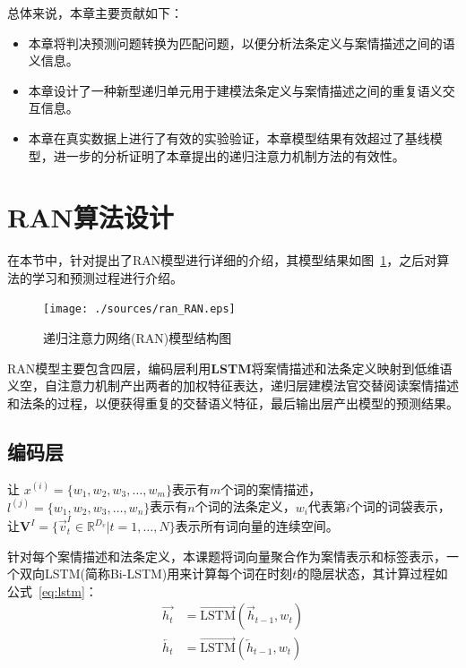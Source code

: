 总体来说，本章主要贡献如下：
\begin{itemize}
    \item 本章将判决预测问题转换为匹配问题，以便分析法条定义与案情描述之间的语义信息。
    \item 本章设计了一种新型递归单元用于建模法条定义与案情描述之间的重复语义交互信息。
    \item 本章在真实数据上进行了有效的实验验证，本章模型结果有效超过了基线模型，进一步的分析证明了本章提出的递归注意力机制方法的有效性。
\end{itemize}

\section{RAN算法设计}
\label{sec:ran_algori}

在本节中，针对提出了RAN模型进行详细的介绍，其模型结果如图~\ref{fig:ran_model}，之后对算法的学习和预测过程进行介绍。
\begin{figure}[htbp]
    \centering
    \texttt{[image: ./sources/ran\_RAN.eps]}
    \vspace{-10pt}
    \caption{\label{fig:ran_model} 递归注意力网络(RAN)模型结构图 }
    \vspace{-5pt}
\end{figure}

RAN模型主要包含四层，编码层利用\textbf{LSTM}将案情描述和法条定义映射到低维语义空，自注意力机制产出两者的加权特征表达，递归层建模法官交替阅读案情描述和法条的过程，以便获得重复的交替语义特征，最后输出层产出模型的预测结果。

\subsection{编码层}
让 $x^{(i)} = {\{w_1, w_2, w_3, \dots, w_m\}}$表示有$m$个词的案情描述， $l^{(j)} = {\{w_1, w_2, w_3, \dots, w_n\}}$表示有$n$个词的法条定义，$w_i$代表第$i$个词的词袋表示，让$\textbf{V}^I=\{\vec{v}^I_t\in \mathbb{R}^{D_v}|t=1,\dots,N\}$表示所有词向量的连续空间。

针对每个案情描述和法条定义，本课题将词向量聚合作为案情表示和标签表示，一个双向LSTM(简称Bi-LSTM)用来计算每个词在时刻$t$的隐层状态，其计算过程如公式~\ref{eq:lstm}：
\begin{equation}\label{eq:lstm}
    \begin{aligned}
        \overrightarrow{h_t}&=\overrightarrow{\text{LSTM}}(\overrightarrow{h}_{t-1}, w_t)\\
        \overleftarrow{h_t}&=\overrightarrow{\text{LSTM}}(\overleftarrow{h}_{t-1}, w_t)\\
    \end{aligned}
\end{equation}

